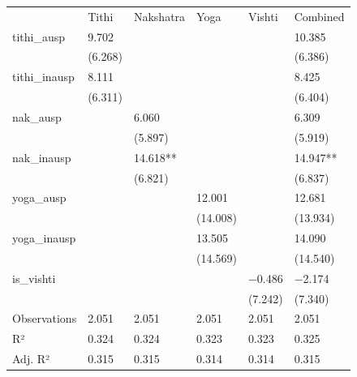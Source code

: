 \begin{tabular}{llllll}
& Tithi & Nakshatra & Yoga & Vishti & Combined \\
tithi\_ausp & \num{9.702} &  &  &  & \num{10.385} \\
& (\num{6.268}) &  &  &  & (\num{6.386}) \\
tithi\_inausp & \num{8.111} &  &  &  & \num{8.425} \\
& (\num{6.311}) &  &  &  & (\num{6.404}) \\
nak\_ausp &  & \num{6.060} &  &  & \num{6.309} \\
&  & (\num{5.897}) &  &  & (\num{5.919}) \\
nak\_inausp &  & \num{14.618}** &  &  & \num{14.947}** \\
&  & (\num{6.821}) &  &  & (\num{6.837}) \\
yoga\_ausp &  &  & \num{12.001} &  & \num{12.681} \\
&  &  & (\num{14.008}) &  & (\num{13.934}) \\
yoga\_inausp &  &  & \num{13.505} &  & \num{14.090} \\
&  &  & (\num{14.569}) &  & (\num{14.540}) \\
is\_vishti &  &  &  & \num{-0.486} & \num{-2.174} \\
&  &  &  & (\num{7.242}) & (\num{7.340}) \\
Observations & \num{2,051} & \num{2,051} & \num{2,051} & \num{2,051} & \num{2,051} \\
R² & \num{0.324} & \num{0.324} & \num{0.323} & \num{0.323} & \num{0.325} \\
Adj. R² & \num{0.315} & \num{0.315} & \num{0.314} & \num{0.314} & \num{0.315} \\
\end{tabular}
